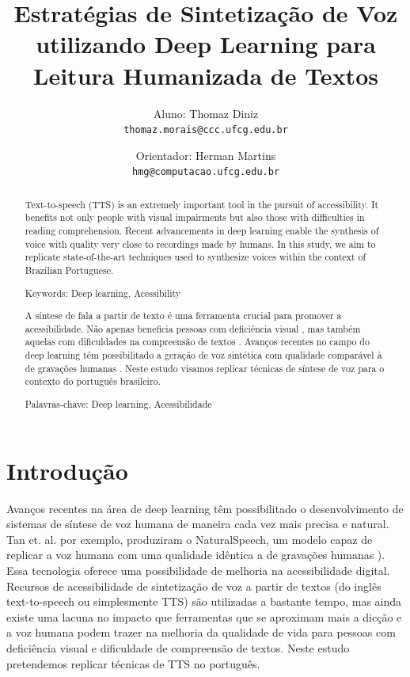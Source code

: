 \documentclass[a4paper,12pt]{article}
\title{Estratégias de Sintetização de Voz utilizando Deep Learning para Leitura Humanizada de Textos}
\author{
  Aluno: Thomaz Diniz\\
  \texttt{thomaz.morais@ccc.ufcg.edu.br}
  \and
  Orientador: Herman Martins\\
  \texttt{hmg@computacao.ufcg.edu.br}
}
\date{}
\begin{document}
	
	\maketitle
	\begin{abstract}
		Text-to-speech (TTS) is an extremely important tool in the pursuit of accessibility. It benefits not only people with visual impairments but also those with difficulties in reading comprehension. Recent advancements in deep learning enable the synthesis of voice with quality very close to recordings made by humans. In this study, we aim to replicate state-of-the-art techniques used to synthesize voices within the context of Brazilian Portuguese.
		
		Keywords: Deep learning, Acessibility
	\end{abstract}


	\begin{abstract}
		A síntese de fala a partir de texto é uma ferramenta crucial para promover a acessibilidade. Não apenas beneficia pessoas com deficiência visual \cite{WAI_2024_guidlines_for_accessibility}, mas também aquelas com dificuldades na compreensão de textos \cite{wood2017readingaccessibility}. Avanços recentes no campo do deep learning têm possibilitado a geração de voz sintética com qualidade comparável à de gravações humanas \cite{tan2022naturalspeech}. Neste estudo visamos replicar técnicas de  síntese de voz para o contexto do português brasileiro.
		
		Palavras-chave: Deep learning, Acessibilidade
	\end{abstract}


	
	\section{Introdução}
	
		Avanços recentes na área de deep learning têm possibilitado o desenvolvimento de sistemas de síntese de voz humana de maneira cada vez mais precisa e natural. Tan et. al. por exemplo, produziram o NaturalSpeech, um modelo capaz de replicar a voz humana com uma qualidade idêntica a de gravações humanas \cite{tan2022naturalspeech}). Essa tecnologia oferece uma possibilidade de melhoria na acessibilidade digital. Recursos de acessibilidade de sintetização de voz a partir de textos (do inglês text-to-speech ou simplesmente TTS) são utilizadas a bastante tempo, mas ainda existe uma lacuna no impacto que ferramentas que se aproximam mais a dicção e a voz humana podem trazer na melhoria da qualidade de vida para pessoas com deficiência visual e dificuldade de compreensão de textos. Neste estudo pretendemos replicar técnicas de TTS  no português.
\end{document}
